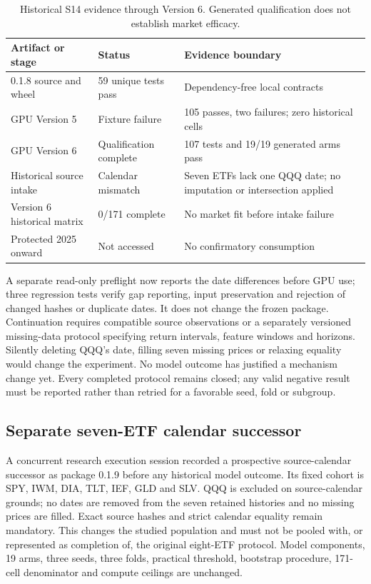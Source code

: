 \documentclass[11pt,a4paper]{article}
\begin{document}
\begin{table}[ht]
\centering\small
\begin{tabularx}{\linewidth}{p{.20\linewidth}p{.22\linewidth}X}
\toprule Artifact or stage & Status & Evidence boundary \\
\midrule
0.1.8 source and wheel & 59 unique tests pass & Dependency-free local contracts \\
GPU Version 5 & Fixture failure & 105 passes, two failures; zero historical cells \\
GPU Version 6 & Qualification complete & 107 tests and 19/19 generated arms pass \\
Historical source intake & Calendar mismatch & Seven ETFs lack one QQQ date; no imputation or intersection applied \\
Version 6 historical matrix & 0/171 complete & No market fit before intake failure \\
Protected 2025 onward & Not accessed & No confirmatory consumption \\
\bottomrule
\end{tabularx}
\caption{Historical S14 evidence through Version 6. Generated qualification does not establish
market efficacy.}
\label{tab:s14-ledger}
\end{table}

A separate read-only preflight now reports the date differences before GPU use;
three regression tests verify gap reporting, input preservation and rejection of
changed hashes or duplicate dates. It does not change the frozen package.
Continuation requires compatible source observations or a separately versioned
missing-data protocol specifying return intervals, feature windows and horizons.
Silently deleting QQQ's date, filling seven missing prices or relaxing equality
would change the experiment. No model outcome has justified a mechanism change yet.
Every completed protocol remains closed; any valid negative result must be
reported rather than retried for a favorable seed, fold or subgroup.

\subsection{Separate seven-ETF calendar successor}

A concurrent research execution session recorded a prospective source-calendar
successor as package 0.1.9 before any historical model outcome. Its fixed cohort
is SPY, IWM, DIA, TLT, IEF, GLD and SLV. QQQ is excluded on source-calendar grounds;
no dates are removed from the seven retained histories and no missing prices
are filled. Exact source hashes and strict calendar equality remain mandatory.
This changes the studied population and must not be pooled with, or represented
as completion of, the original eight-ETF protocol. Model components, 19 arms,
three seeds, three folds, practical threshold, bootstrap procedure, 171-cell
denominator and compute ceilings are unchanged.
\end{document}
